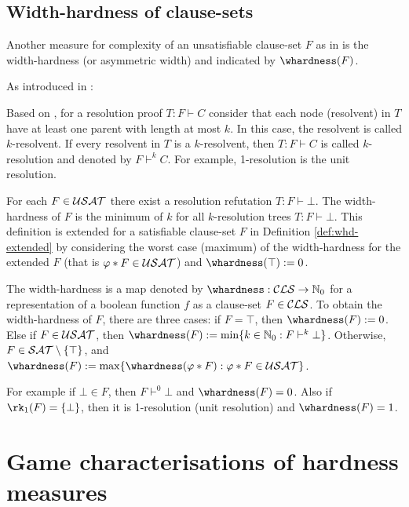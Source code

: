 \documentclass{report}
\begin{document}
\subsection{Width-hardness of clause-sets}
\label{sec:whdd}

Another measure for complexity of an unsatisfiable clause-set $F$ as in \cite{h18, h13} is the width-hardness (or asymmetric width) and indicated by $\whardness(F)$. 

As introduced in \cite{h19}:
\begin{defi}\label{def:kres}
Based on \cite{h33}, for a resolution proof $T: F \vdash C$ consider that each node (resolvent) in $T$ have at least one parent with length at most $k$. In this case, the resolvent is called $k$-resolvent. If every resolvent in $T$ is a $k$-resolvent, then $T:F \vdash C$ is called $k$-resolution and denoted by $F \vdash^k C$. For example, 1-resolution is the unit resolution.
\end{defi}

For each $F \in \mathcal{USAT}$ there exist a resolution refutation $T:F \vdash \bot$. The width-hardness of $F$ is the minimum of $k$ for all $k$-resolution trees $T:F \vdash \bot$. This definition is extended for a satisfiable clause-set $F$ in Definition \ref{def:whd-extended} by considering the worst case (maximum) of the width-hardness for the extended $F$ (that is $ \varphi * F \in \mathcal{USAT}$) and $\whardness(\top):=0$.

\begin{defi}\label{def:whd-extended}
The width-hardness is a map denoted by $\whardness : \Cls \rightarrow \NNZ$ for a representation of a boolean function $f$ as a clause-set $F \in \mathcal{CLS}$. To obtain the width-hardness of  $F$, there are three cases: if $F = \top$, then $\whardness(F) := 0$. Else if $F \in \mathcal{USAT}$, then $\whardness(F) := \min \set{k \in \NNZ : F \vdash^k \bot}$. Otherwise, $F \in \mathcal{SAT} \setminus \{ \top \}$, and $\whardness(F) := \max \set{ \whardness(\vp * F) : \vp * F \in \Usat }$.
\end{defi}

For example if $\bot \in F$, then $F \vdash^0 \bot$ and $\whardness(F)=0$. Also if $\rk_1(F)=\set{\bot}$, then it is 1-resolution (unit resolution) and  $\whardness(F)=1$.
\section{Game characterisations of hardness measures}
\label{sec:game-pd}
\end{document}
